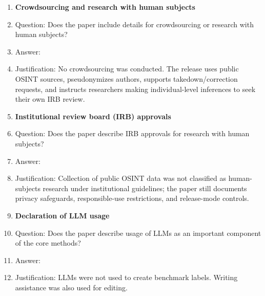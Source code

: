 \documentclass{article}
\begin{document}
\begin{enumerate}
\item {\bf Crowdsourcing and research with human subjects}
    \item[] Question: Does the paper include details for crowdsourcing or research with human subjects?
    \item[] Answer: \answerNA{}
    \item[] Justification: No crowdsourcing was conducted. The release uses public OSINT sources, pseudonymizes authors, supports takedown/correction requests, and instructs researchers making individual-level inferences to seek their own IRB review.

\item {\bf Institutional review board (IRB) approvals}
    \item[] Question: Does the paper describe IRB approvals for research with human subjects?
    \item[] Answer: \answerNA{}
    \item[] Justification: Collection of public OSINT data was not classified as human-subjects research under institutional guidelines; the paper still documents privacy safeguards, responsible-use restrictions, and release-mode controls.

\item {\bf Declaration of LLM usage}
    \item[] Question: Does the paper describe usage of LLMs as an important component of the core methods?
    \item[] Answer: \answerYes{}
    \item[] Justification: LLMs were not used to create benchmark labels. Writing assistance was also used for editing.

\end{enumerate}
\end{document}
